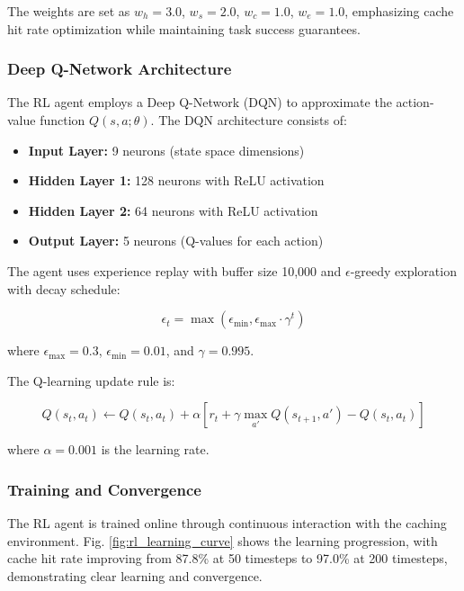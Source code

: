 The weights are set as $w_h = 3.0$, $w_s = 2.0$, $w_c = 1.0$, $w_e = 1.0$, emphasizing cache hit rate optimization while maintaining task success guarantees.

\subsubsection{Deep Q-Network Architecture}

The RL agent employs a Deep Q-Network (DQN) \cite{mnih2015human} to approximate the action-value function $Q(s, a; \theta)$. The DQN architecture consists of:

\begin{itemize}
    \item \textbf{Input Layer:} 9 neurons (state space dimensions)
    \item \textbf{Hidden Layer 1:} 128 neurons with ReLU activation
    \item \textbf{Hidden Layer 2:} 64 neurons with ReLU activation
    \item \textbf{Output Layer:} 5 neurons (Q-values for each action)
\end{itemize}

The agent uses experience replay with buffer size 10,000 and $\epsilon$-greedy exploration with decay schedule:

\begin{equation}
\epsilon_t = \max(\epsilon_{\min}, \epsilon_{\max} \cdot \gamma^t)
\end{equation}

where $\epsilon_{\max} = 0.3$, $\epsilon_{\min} = 0.01$, and $\gamma = 0.995$.

The Q-learning update rule is:

\begin{equation}
Q(s_t, a_t) \leftarrow Q(s_t, a_t) + \alpha [r_t + \gamma \max_{a'} Q(s_{t+1}, a') - Q(s_t, a_t)]
\end{equation}

where $\alpha = 0.001$ is the learning rate.

\subsubsection{Training and Convergence}

The RL agent is trained online through continuous interaction with the caching environment. Fig. \ref{fig:rl_learning_curve} shows the learning progression, with cache hit rate improving from 87.8\% at 50 timesteps to 97.0\% at 200 timesteps, demonstrating clear learning and convergence.

